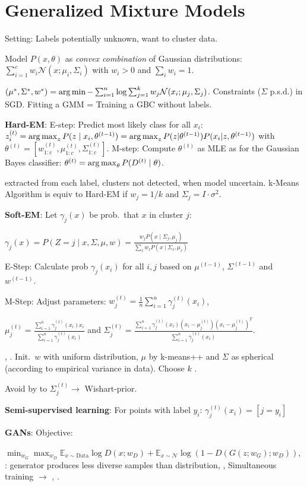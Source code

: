 \section{Generalized Mixture Models}

Setting: Labels potentially unknown, want to cluster data.

Model $P(x, \theta)$ as \emph{convex combination} of Gaussian distributions:
$\sum_{i=1}^c w_i \mathcal{N}(x; \mu_i, \Sigma_i)$ with $w_i > 0$ and $\sum_i w_i =
1$.

$(\mu^*, \Sigma^*, w^*) = \operatorname*{arg\,min} - \sum_{i=1}^n \log \sum_{j=1}^k w_j \mathcal{N}(x_i; \mu_j,
\Sigma_j)$. Constraints ($\Sigma$ p.s.d.)  in SGD. Fitting a GMM = Training a GBC without labels.

\textbf{Hard-EM}: E-step: Predict most likely class for all $x_i$: $z_i^{(t)} = \operatorname*{arg\,max}_z P(z \mid
x_i, \theta^{(t-1)}) = \operatorname*{arg\,max}_z P(z | \theta^{(t-1)}) P(x_i | z, \theta^{(t-1)}) $ with $\theta^{(t)} = [w_{1:c}^{(t)}, \mu_{1:c}^{(t)}, \Sigma_{1:c}^{(t)}]$. M-step: Compute $\theta^{(t)}$ as MLE as for the Gaussian Bayes classifier:
$\theta^{(t)} = \operatorname*{arg\,max}_\theta P(D^{(t)} \mid \theta)$.

 extracted from each label,  clusters
not detected,  when model uncertain. k-Means Algorithm is equiv to Hard-EM if $w_j = 1/k$ and $\Sigma_j = I \cdot \sigma^2$.

\textbf{Soft-EM}: Let $\gamma_j(x)$ be prob.\ that $x$ in cluster $j$:

$\gamma_j(x) = P(Z = j \mid x, \Sigma, \mu, w) = \frac{w_j P(x \mid \Sigma_j, \mu_j
)}{\sum_\ell w_\ell P(x \mid \Sigma_\ell, \mu_\ell)}$

E-Step: Calculate prob $\gamma_j(x_i)$ for all $i, j$ based on $\mu^{(t-1)}$,
$\Sigma^{(t-1)}$ and $w^{(t-1)}$.

M-Step: Adjust parameters: $w_j^{(t)} = \frac{1}{n} \sum_{i=1}^n \gamma_j^{(t)}(x_i)$,

$\mu_j^{(t)} = \frac{\sum_{i=1}^n \gamma_j^{(t)}(x_i) x_i}{\sum_{i=1}^n  \gamma_j^{(t)}(x_i)}$ and
$\Sigma_j^{(t)} = \frac{\sum_{i=1}^n  \gamma_j^{(t)}(x_i) (x_i - \mu^{(t)}_j) (x_i -
\mu_j^{(t)})^T}{\sum_{i=1}^n \gamma_j^{(t)}(x_i)}$.

, . Init.\ $w$ with uniform distribution, $\mu$ by k-means++ and $\Sigma$ as spherical (according to empirical variance in data). Choose $k$ .

Avoid  by  to $\Sigma_j^{(t)}
\rightarrow$ Wishart-prior.

\textbf{Semi-supervised learning}: For points with label $y_i$: $\gamma_j^{(t)}(x_i) = [j = y_i]$

\textbf{GANs}: Objective:

$\min_{w_G} \max_{w_D} \mathbb{E}_{x \sim \text{Data}} \log D(x; w_D) + \mathbb{E}_{x \sim \mathcal{N}} \log(1 - D(G(z; w_G); w_D))$, : generator produces less diverse samples than distribution, , Simultaneous training $\rightarrow$ , .
